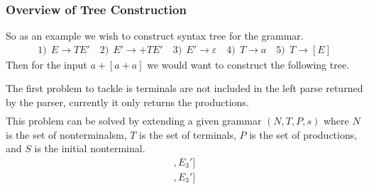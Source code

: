 \documentclass[a4paper,12pt]{article}
\theoremstyle{definition}
\begin{document}
\subsubsection{Overview of Tree Construction}
So as an example we wish to construct syntax tree for the grammar.
\begin{gather*}
  1)\:\: E \to TE' \quad 2)\:\: E' \to +TE' \quad 3)\:\: E' \to \varepsilon \quad 4)\:\: T \to a \quad 5) \: \: T \to [E]
\end{gather*}
Then for the input $a+[a + a]$ we would want to construct the following tree.
\begin{center}
\end{center}
The first problem to tackle is terminals are not included in the left parse returned by the parser, currently it only returns the productions.
\begin{gather*}
  [E_1, T_4, E_2', T_5, E_1, T_4, E_2', T_4, E_3', E_3']
\end{gather*}
This problem can be solved by extending a given grammar $(N, T, P, s)$ where $N$ is the set of nonterminalsm, $T$ is the set of terminals, $P$ is the set of productions, and $S$ is the initial nonterminal.
\begin{gather*}
  [E_1, T_4, A_a, E_2', A_+, T_5, A_[, E_1, T_4, A_a, E_2', A_+, T_4, A_a, E_3', A_], E_3']
\end{gather*}
\begin{gather*}
  [E_1, T_4, a, E_2', +, T_5, [, E_1, T_4, a, E_2', +, T_4, a, E_3', ], E_3']
\end{gather*}
\end{document}
